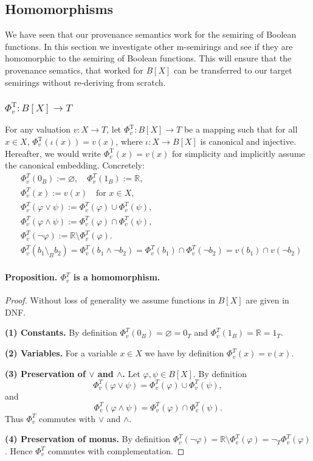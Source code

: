 \subsection{Homomorphisms}
We have seen that our provenance semantics work for 
the semiring of Boolean functions. In this section we investigate other m-semirings and see if they are homomorphic 
to the semiring of Boolean functions. This will ensure that the provenance sematics, that worked for $B[X]$ can be transferred to 
our target semirings without re-deriving from scratch.


\subsubsection{$\Phi^{\mathrm{T}}_v : B[X] \to T$}
For any valuation $v:X \to T$, let $\Phi^{\mathrm{T}}_v : B[X] \to T$ be a mapping such that for all $x\in X$, 
$\Phi^{\mathrm{T}}_v(\iota(x))=v(x)$, where $\iota:X\rightarrow B[X]$ is canonical and injective. Hereafter, we would
write $\Phi^{\mathrm{T}}_v(x)=v(x)$ for simplicity and implicitly assume the canonical embedding.
Concretely:
\begin{align*}
&\Phi_v^T(0_B) := \varnothing,\quad\Phi_v^T(1_B) := \mathbb{R},\\
&\Phi_v^T(x) := v(x)\quad\text{for }x\in X,\\
&\Phi_v^T(\varphi\vee\psi) := \Phi_v^T(\varphi)\cup\Phi_v^T(\psi),\\
&\Phi_v^T(\varphi\wedge\psi) := \Phi_v^T(\varphi)\cap\Phi_v^T(\psi),\\
&\Phi_v^T(\neg\varphi) := \mathbb{R}\setminus\Phi_v^T(\varphi).\\
&\Phi_v^T(b_1 \setminus_B b_2) = \Phi_v^T(b_1 \wedge \neg b_2) = \Phi_v^T(b_1)\cap \Phi_v^T(\neg b_2)= v(b_1)\cap v(\neg b_2)
\end{align*}

\medskip

\paragraph{Proposition. \(\Phi_v^T\) is a homomorphism.}

\begin{proof}
Without loss of generality we assume functions in \(B[X]\) are given in DNF.

\textbf{(1) Constants.}
By definition \(\Phi_v^T(0_B)=\varnothing=0_T\) and \(\Phi_v^T(1_B)=\mathbb{R}=1_T\).

\textbf{(2) Variables.}
For a variable \(x\in X\) we have by definition \(\Phi_v^T(x)=v(x)\).

\textbf{(3) Preservation of \(\vee\) and \(\wedge\).}
Let \(\varphi,\psi\in B[X]\). By definition
\[
\Phi_v^T(\varphi\vee\psi)=\Phi_v^T(\varphi)\cup\Phi_v^T(\psi),
\]and
\[
\Phi_v^T(\varphi\wedge\psi)=\Phi_v^T(\varphi)\cap\Phi_v^T(\psi).
\]
Thus \(\Phi_v^T\) commutes with \(\vee\) and \(\wedge\).

\textbf{(4) Preservation of monus.}
By definition \(\Phi_v^T(\neg\varphi)=\mathbb{R}\setminus\Phi_v^T(\varphi)=\neg_T\Phi_v^T(\varphi)\). Hence \(\Phi_v^T\) commutes with complementation.

\end{proof}

